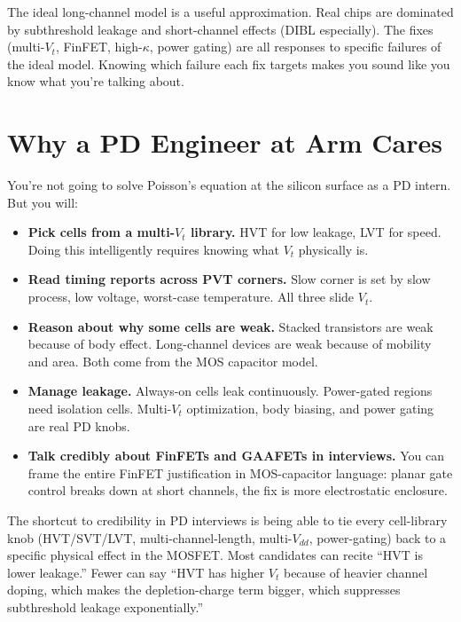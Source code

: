 \documentclass[11pt]{article}
\begin{document}
\begin{checkpoint}
The ideal long-channel model is a useful approximation. Real chips are dominated by subthreshold leakage and short-channel effects (DIBL especially). The fixes (multi-$V_t$, FinFET, high-$\kappa$, power gating) are all responses to specific failures of the ideal model. Knowing which failure each fix targets makes you sound like you know what you're talking about.
\end{checkpoint}

\section{Why a PD Engineer at Arm Cares}

You're not going to solve Poisson's equation at the silicon surface as a PD intern. But you will:

\begin{itemize}
\item \textbf{Pick cells from a multi-$V_t$ library.} HVT for low leakage, LVT for speed. Doing this intelligently requires knowing what $V_t$ physically is.
\item \textbf{Read timing reports across PVT corners.} Slow corner is set by slow process, low voltage, worst-case temperature. All three slide $V_t$.
\item \textbf{Reason about why some cells are weak.} Stacked transistors are weak because of body effect. Long-channel devices are weak because of mobility and area. Both come from the MOS capacitor model.
\item \textbf{Manage leakage.} Always-on cells leak continuously. Power-gated regions need isolation cells. Multi-$V_t$ optimization, body biasing, and power gating are real PD knobs.
\item \textbf{Talk credibly about FinFETs and GAAFETs in interviews.} You can frame the entire FinFET justification in MOS-capacitor language: planar gate control breaks down at short channels, the fix is more electrostatic enclosure.
\end{itemize}

\begin{pdnote}
The shortcut to credibility in PD interviews is being able to tie every cell-library knob (HVT/SVT/LVT, multi-channel-length, multi-$V_{dd}$, power-gating) back to a specific physical effect in the MOSFET. Most candidates can recite ``HVT is lower leakage.'' Fewer can say ``HVT has higher $V_t$ because of heavier channel doping, which makes the depletion-charge term bigger, which suppresses subthreshold leakage exponentially.''
\end{pdnote}
\end{document}
